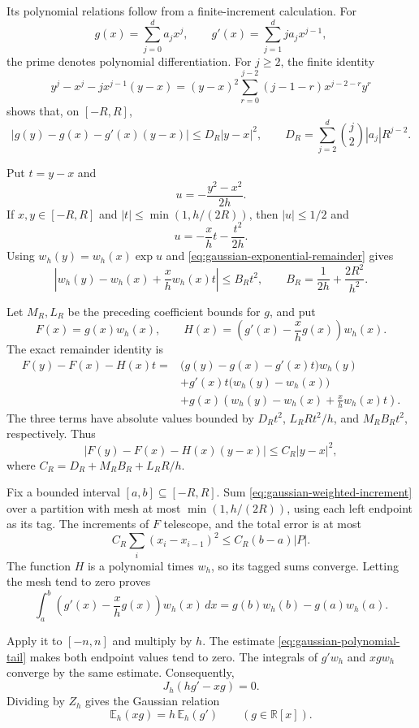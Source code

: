 Its polynomial relations follow from a finite-increment calculation.
For
\[
 g(x)=\sum_{j=0}^d a_jx^j,
 \qquad
 g'(x)=\sum_{j=1}^d j a_jx^{j-1},
\]
the prime denotes polynomial differentiation.
For $j\geq2$, the finite identity
\[
 y^j-x^j-jx^{j-1}(y-x)
 =
 (y-x)^2
 \sum_{r=0}^{j-2}(j-1-r)x^{j-2-r}y^r
\]
shows that, on $[-R,R]$,
\[
 |g(y)-g(x)-g'(x)(y-x)|
 \leq D_R|y-x|^2,
 \qquad
 D_R=\sum_{j=2}^d\binom j2|a_j|R^{j-2}.
\]

Put $t=y-x$ and
\[
 u=-\frac{y^2-x^2}{2h}.
\]
If $x,y\in[-R,R]$ and
$|t|\leq\min(1,h/(2R))$, then $|u|\leq1/2$ and
\[
 u=-\frac{x}{h}t-\frac{t^2}{2h}.
\]
Using $w_h(y)=w_h(x)\exp u$ and
\eqref{eq:gaussian-exponential-remainder} gives
\[
 \left|w_h(y)-w_h(x)+\frac{x}{h}w_h(x)t\right|
 \leq B_Rt^2,
 \qquad
 B_R=\frac1{2h}+\frac{2R^2}{h^2}.
\]

Let $M_R,L_R$ be the preceding coefficient bounds for $g$, and put
\[
 F(x)=g(x)w_h(x),\qquad
 H(x)=\left(g'(x)-\frac{x}{h}g(x)\right)w_h(x).
\]
The exact remainder identity is
\[
 \begin{split}
 F(y)-F(x)-H(x)t
 ={}&\bigl(g(y)-g(x)-g'(x)t\bigr)w_h(y)\\
 &+g'(x)t\bigl(w_h(y)-w_h(x)\bigr)\\
 &+g(x)\left(w_h(y)-w_h(x)+\frac{x}{h}w_h(x)t\right).
 \end{split}
\]
The three terms have absolute values bounded by
$D_Rt^2$, $L_RRt^2/h$, and $M_RB_Rt^2$, respectively.
Thus
\begin{equation}
 \label{eq:gaussian-weighted-increment}
 |F(y)-F(x)-H(x)(y-x)|
 \leq C_R|y-x|^2,
\end{equation}
where $C_R=D_R+M_RB_R+L_RR/h$.

Fix a bounded interval $[a,b]\subseteq[-R,R]$.
Sum \eqref{eq:gaussian-weighted-increment} over a partition with
mesh at most $\min(1,h/(2R))$, using each left endpoint as its tag.
The increments of $F$ telescope, and the total error is at most
\[
 C_R\sum_i(x_i-x_{i-1})^2
 \leq C_R(b-a)|P|.
\]
The function $H$ is a polynomial times $w_h$, so its tagged sums converge.
Letting the mesh tend to zero proves
\[
 \int_a^b
 \left(g'(x)-\frac{x}{h}g(x)\right)w_h(x)\,dx
 =g(b)w_h(b)-g(a)w_h(a).
\]

Apply it to $[-n,n]$ and multiply by $h$.
The estimate \eqref{eq:gaussian-polynomial-tail} makes both endpoint
values tend to zero.
The integrals of $g'w_h$ and $xgw_h$ converge by the same estimate.
Consequently,
\[
 J_h(hg'-xg)=0.
\]
Dividing by $Z_h$ gives the Gaussian relation
\begin{equation}
 \label{eq:gaussian-real-ward}
 \mathbb E_h(xg)=h\,\mathbb E_h(g')
 \qquad(g\in\mathbb R[x]).
\end{equation}

